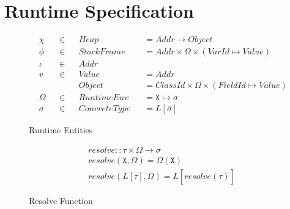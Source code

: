 \newpage

\section{Runtime Specification} \label{sec:genus-rs}

\begin{figure}[H]
    \centering
    \begin{align*}
        &\chi & &\in & &Heap & &= Addr \to Object \\
        &\phi & &\in & &StackFrame & &= Addr \times \Omega \times (VarId \mapsto Value) \\
        &\iota & &\in & &Addr & & \\
        &v & &\in & &Value & &= Addr \\
        & & & & &Object & &= ClassId \times \Omega \times (FieldId \mapsto Value) \\
        &\Omega & &\in & &RuntimeEnv & &= \texttt{X} \mapsto \sigma \\
        &\sigma & &\in & &ConcreteType & &= L[\overline{\sigma}]
    \end{align*}
    \caption{Runtime Entities}
    \label{fig:genus-runent}
\end{figure}

\begin{figure}[h]
    \centering
    \begin{align*}
    &resolve :: \tau \times \Omega \to \sigma \\
    &resolve(\texttt{X}, \Omega) = \Omega(\texttt{X}) \\
    &resolve(L[\overline{\tau}], \Omega) = L[\overline{resolve(\tau)}]
    \end{align*}
    \caption{Resolve Function}
    \label{fig:genus-resolve}
\end{figure}

